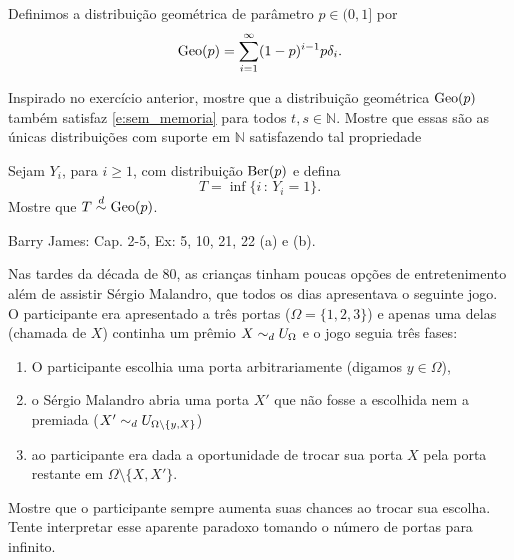 Definimos a distribuição geométrica  de parâmetro $p \in (0,1]$ por
\begin{equation}
  \operatorname{Geo}(p) = \sum_{i = 1}^\infty (1-p)^{i-1} p \delta_i.
\end{equation}

\begin{exercise}
  Inspirado no exercício anterior, mostre que a distribuição geométrica $\operatorname{Geo}(p)$ também satisfaz \eqref{e:sem_memoria} para todos $t, s \in \mathbb{N}$.
  Mostre que essas são as únicas distribuições com suporte em $\mathbb{N}$ satisfazendo tal propriedade
\end{exercise}

\begin{exercise}
  \label{x:geo_time}
  Sejam $Y_i$, para $i \geq 1$, \iid com distribuição $\operatorname{Ber}(p)$ e defina
  \begin{equation}
    T = \inf\{i\, : \, Y_i = 1\}.
  \end{equation}
  Mostre que $T \overset{d}\sim \operatorname{Geo}(p)$.
\end{exercise}

\begin{exercise}
  Barry James: Cap. 2-5, Ex: 5, 10, 21, 22 (a) e (b).
\end{exercise}

\begin{exercise}
  Nas tardes da década de 80, as crianças tinham poucas opções de entretenimento além de assistir Sérgio Malandro, que todos os dias apresentava o seguinte jogo.
  O participante era apresentado a três portas ($\Omega = \{1,2,3\}$) e apenas uma delas (chamada de $X$) continha um prêmio $X \sim_d U_{\Omega}$ e o jogo seguia três fases:
  \begin{enumerate}[\quad a)]
  \item O participante escolhia uma porta arbitrariamente (digamos $y \in \Omega$),
  \item o Sérgio Malandro abria uma porta $X'$ que não fosse a escolhida nem a premiada ($X' \sim_d U_{\Omega \setminus \{y, X\}}$)
  \item ao participante era dada a oportunidade de trocar sua porta $X$ pela porta restante em $\Omega \setminus \{X, X'\}$.
  \end{enumerate}
  Mostre que o participante sempre aumenta suas chances ao trocar sua escolha.
  Tente interpretar esse aparente paradoxo tomando o número de portas para infinito.
\end{exercise}

